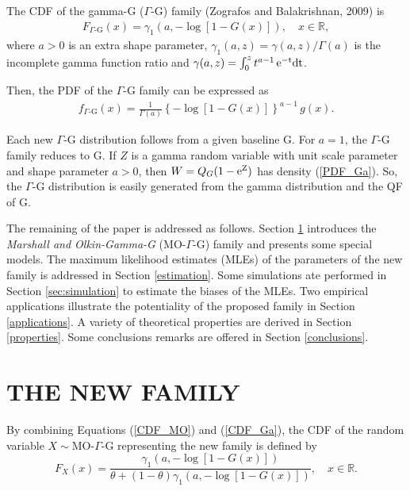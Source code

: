 \documentclass[twoside,leqno,11pt]{article}
\begin{document}
The CDF of the gamma-G ($\Gamma$-G) family (Zografos and Balakrishnan, 2009) is
\begin{eqnarray}\label{CDF_Ga}
F_{\Gamma\text{-G}}(x)=\gamma_1\left( a, -\log \left[1-G(x)\right]\right), \quad x \in \mathbb{R},
\end{eqnarray}
where $a>0$ is an extra shape parameter,  $\gamma_1(a,z)= \gamma(a,z)/\Gamma(a)$ is the incomplete gamma function ratio
and $\gamma(a,z)=\int_0^{z} t^{a-1}\,\rm{e}^{-t}dt$.

Then, the PDF of the $\Gamma$-G family can be expressed as
\begin{eqnarray}\label{PDF_Ga}
\displaystyle
f_{\Gamma\text{-G}}(x)=\frac{\displaystyle 1}{\displaystyle \Gamma(a)} \left\{ -\log[1-G(x)] \right\}^{a-1}\, g(x).
\end{eqnarray}

Each new $\Gamma$-G distribution follows from a given baseline G.
For $a=1$, the $\Gamma$-G family reduces to G.
If $Z$ is a gamma random variable with unit scale
parameter and shape parameter $a>0$, then $W=Q_G(1-\rm{e}^{Z})$ has density (\ref{PDF_Ga}). So,
the $\Gamma$-G distribution is easily generated from the gamma distribution and the QF of G.

The remaining of the paper is addressed as follows. Section \ref{sec:MOGaG} introduces the {\it Marshall and Olkin-Gamma-G} (MO-$\Gamma$-G)
family and presents some special models. The maximum likelihood estimates (MLEs) of the parameters of the new family is addressed
in Section \ref{estimation}. Some simulations ate performed in Section \ref{sec:simulation} to estimate the biases of the MLEs. Two
empirical applications illustrate the potentiality of the proposed family in Section \ref{applications}. A variety of theoretical properties are derived
in Section \ref{properties}. Some conclusions remarks are offered in Section \ref{conclusions}.

\section{THE NEW FAMILY}\label{sec:MOGaG}

By combining Equations (\ref{CDF_MO}) and (\ref{CDF_Ga}), the CDF of the random variable $X\sim$MO-$\Gamma$-G
representing the new family is defined by
\begin{equation}\label{CDF_MO-Gamma-G}
F_{X}(x)=\frac{\gamma_1\left( a, -\log \left[1-G(x)\right]\right)}{\theta+(1-\theta)\gamma_1\left( a, -\log \left[1-G(x)\right]\right)},\quad x \in \mathbb{R}.
\end{equation}
\end{document}
